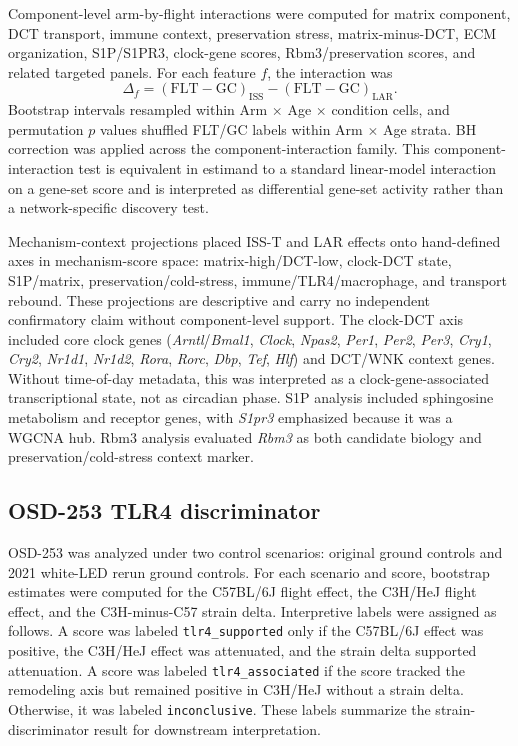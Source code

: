 \documentclass[11pt]{article}
\newcommand{\code}[1]{\texttt{#1}}
\newcommand{\gene}[1]{\textit{#1}}
\begin{document}
Component-level arm-by-flight interactions were computed for matrix component, DCT transport, immune context, preservation stress, matrix-minus-DCT, ECM organization, S1P/S1PR3, clock-gene scores, Rbm3/preservation scores, and related targeted panels. For each feature $f$, the interaction was
\begin{equation}
\Delta_f=(\mathrm{FLT}-\mathrm{GC})_{\mathrm{ISS}}-(\mathrm{FLT}-\mathrm{GC})_{\mathrm{LAR}}.
\end{equation}
Bootstrap intervals resampled within Arm $\times$ Age $\times$ condition cells, and permutation $p$ values shuffled FLT/GC labels within Arm $\times$ Age strata. BH correction was applied across the component-interaction family. This component-interaction test is equivalent in estimand to a standard linear-model interaction on a gene-set score and is interpreted as differential gene-set activity rather than a network-specific discovery test.

Mechanism-context projections placed ISS-T and LAR effects onto hand-defined axes in mechanism-score space: matrix-high/DCT-low, clock-DCT state, S1P/matrix, preservation/cold-stress, immune/TLR4/macrophage, and transport rebound. These projections are descriptive and carry no independent confirmatory claim without component-level support. The clock-DCT axis included core clock genes (\gene{Arntl}/\gene{Bmal1}, \gene{Clock}, \gene{Npas2}, \gene{Per1}, \gene{Per2}, \gene{Per3}, \gene{Cry1}, \gene{Cry2}, \gene{Nr1d1}, \gene{Nr1d2}, \gene{Rora}, \gene{Rorc}, \gene{Dbp}, \gene{Tef}, \gene{Hlf}) and DCT/WNK context genes. Without time-of-day metadata, this was interpreted as a clock-gene-associated transcriptional state, not as circadian phase. S1P analysis included sphingosine metabolism and receptor genes, with \gene{S1pr3} emphasized because it was a WGCNA hub. Rbm3 analysis evaluated \gene{Rbm3} as both candidate biology and preservation/cold-stress context marker.

\subsection{OSD-253 TLR4 discriminator}

OSD-253 was analyzed under two control scenarios: original ground controls and 2021 white-LED rerun ground controls. For each scenario and score, bootstrap estimates were computed for the C57BL/6J flight effect, the C3H/HeJ flight effect, and the C3H-minus-C57 strain delta. Interpretive labels were assigned as follows. A score was labeled \code{tlr4\_supported} only if the C57BL/6J effect was positive, the C3H/HeJ effect was attenuated, and the strain delta supported attenuation. A score was labeled \code{tlr4\_associated} if the score tracked the remodeling axis but remained positive in C3H/HeJ without a strain delta. Otherwise, it was labeled \code{inconclusive}. These labels summarize the strain-discriminator result for downstream interpretation.
\end{document}
